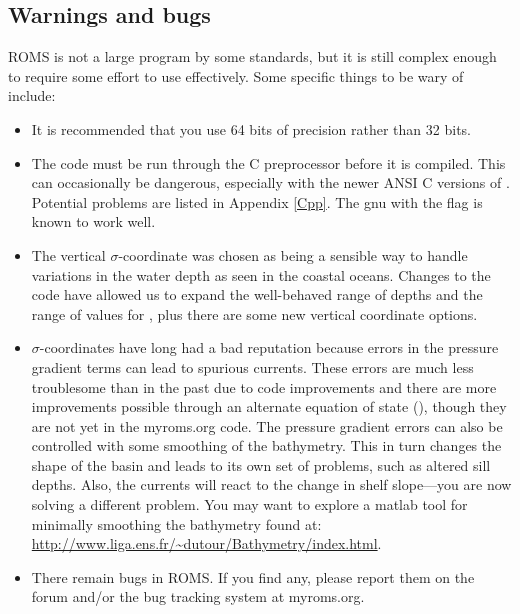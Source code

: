 \subsection{Warnings and bugs}
ROMS is not a large program by some standards, but it is still complex
enough to require some effort to use effectively.
Some specific things to be wary of include:
\begin{itemize}
  \item It is recommended that you use 64 bits of precision rather
than 32 bits.
  \item The code must be run through the C preprocessor before it
is compiled.  This can occasionally be dangerous, especially with
the newer ANSI C versions of .  Potential problems are listed
in Appendix \ref{Cpp}. The gnu  with the  flag
is known to work well.
  \item The vertical $\sigma$-coordinate was chosen as being a sensible
way to handle variations in the water depth as seen in the coastal
oceans. Changes to the code have allowed us to expand the well-behaved
range of depths and the range of values for , plus there
are some new vertical coordinate options.
  \item $\sigma$-coordinates have long had a bad reputation
because errors in the pressure gradient terms can lead to spurious
currents. These errors are much less troublesome than in the past due
to code improvements and there are more improvements possible
through an alternate equation of state (\cite{SS2008c}), though
they are not yet in the myroms.org code. The pressure gradient
errors can also be controlled with some smoothing
of the bathymetry. This in turn changes the shape of the basin and
leads to its own set of problems, such as altered sill depths. Also, the
currents will react to the change in shelf slope---you are now solving a
different problem. You may want to explore a matlab tool for minimally
smoothing the bathymetry found at:
\url{http://www.liga.ens.fr/~dutour/Bathymetry/index.html}.
  \item There remain bugs in ROMS. If you find any, please report
them on the forum and/or the bug tracking system at myroms.org.
\end{itemize}

